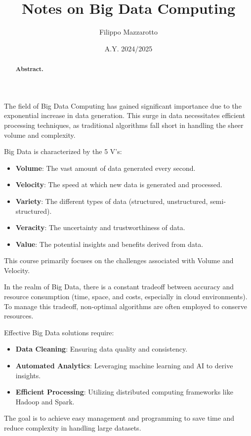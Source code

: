 \documentclass[a4paper]{tufte-handout} %
\title{Notes on Big Data Computing}
\author{Filippo Mazzarotto}
\date{A.Y. 2024/2025}
\begin{document}
\maketitle %

\begin{abstract}
	\textbf{Abstract.}
\end{abstract}

The field of Big Data Computing has gained significant importance due to the exponential increase in data generation. This surge in data necessitates efficient processing techniques, as traditional algorithms fall short in handling the sheer volume and complexity.

Big Data is characterized by the 5 V's:
\begin{itemize}
	\item \textbf{Volume}: The vast amount of data generated every second.
	\item \textbf{Velocity}: The speed at which new data is generated and processed.
	\item \textbf{Variety}: The different types of data (structured, unstructured, semi-structured).
	\item \textbf{Veracity}: The uncertainty and trustworthiness of data.
	\item \textbf{Value}: The potential insights and benefits derived from data.
\end{itemize}

This course primarily focuses on the challenges associated with Volume and Velocity. 

In the realm of Big Data, there is a constant tradeoff between accuracy and resource consumption (time, space, and costs, especially in cloud environments). To manage this tradeoff, non-optimal algorithms are often employed to conserve resources.

Effective Big Data solutions require:
\begin{itemize}
	\item \textbf{Data Cleaning}: Ensuring data quality and consistency.
	\item \textbf{Automated Analytics}: Leveraging machine learning and AI to derive insights.
	\item \textbf{Efficient Processing}: Utilizing distributed computing frameworks like Hadoop and Spark.
\end{itemize}
The goal is to achieve easy management and programming to save time and reduce complexity in handling large datasets.
\end{document}
